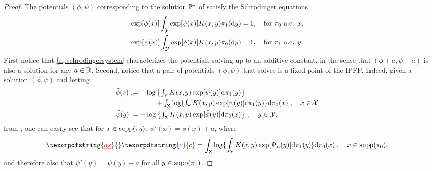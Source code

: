 \documentclass[11pt,a4paper]{article}
\providecommand{\DIFaddtex}[1]{{\protect\color{blue}\uwave{#1}}} %
\providecommand{\DIFdeltex}[1]{{\protect\color{red}\sout{#1}}}                      %
\providecommand{\DIFaddbegin}{} %
\providecommand{\DIFaddend}{} %
\providecommand{\DIFdelbegin}{} %
\providecommand{\DIFdelend}{} %
\providecommand{\DIFadd}[1]{\texorpdfstring{\DIFaddtex{#1}}{#1}} %
\providecommand{\DIFdel}[1]{\texorpdfstring{\DIFdeltex{#1}}{}} %
\begin{document}
\begin{proof}
 The potentials $(\phi, \psi)$ corresponding to the solution $\mathbb{P}^\star$ of  satisfy the Schr\"odinger equations 
 \begin{equation}
     \DIFdelbegin %
\DIFdelend \DIFaddbegin \begin{split}\label{eq:schrodingersystem}
         \exp[\phi(x)] \int_\mcy \exp[\psi(x)] K(x,y) \pi_1(\rmd y) &=1, \quad \text{for $\pi_0$-a.e. $x$}, \\
         \exp[\psi(x)] \int_\mcy  \exp[\phi(x)] K(x,y) \pi_0(\rmd y) &=1, \quad \text{for $\pi_1$-a.e. $y$}.
     \end{split}\DIFaddend 
 \end{equation}
 First notice that \eqref{eq:schrodingersystem} characterizes the potentials solving  up to an additive constant, in the sense that \DIFdelbegin \DIFdel{$(\phi+a, \psi-a)$ }\DIFdelend \DIFaddbegin \DIFadd{$(\phi+c, \psi-c)$ }\DIFaddend is also a solution for any \DIFdelbegin \DIFdel{$a\in \mathbb{R}$}\DIFdelend \DIFaddbegin \DIFadd{$c\in \rset$}\DIFaddend . 
 Second, notice that a pair of potentials $(\phi, \psi)$ that solves  is a fixed point of the IPFP. Indeed, given a solution $(\phi, \psi)$ and letting
 \begin{align}
    &\textstyle{\tilde\phi(x) := -\log \left\{\int_{\mathsf{Y}} K(x,y) \exp[\psi(y)] \mathrm{d}\pi_1(y)\right\} } \\
     &\qquad \qquad \qquad   \textstyle{+ \int_{\mathsf{X}} \log \{ \int_{\mathsf{Y}} K(x,y) \exp[\psi(y)] \mathrm{d}\pi_1(y) \} \mathrm{d}\pi_0(x) \;,  \quad x\in \mathcal{X}} \\
    &\textstyle{\tilde\psi(y) := -\log \left\{\int_{\mathsf{X}} K(x,y) \exp[\tilde\phi(y)] \mathrm{d}\pi_0(x)\right\} \;, \quad y\in \mathcal{Y},} 
  \end{align}
  from , 
 one can easily see that for $x\in \mathrm{supp}(\pi_0)$, \DIFdelbegin \DIFdel{$\phi'(x)=\phi(x)+a$, where 
 }\DIFdelend \DIFaddbegin \DIFadd{$\phi'(x)=\phi(x)+c$, where 
 }\DIFaddend $$\DIFdelbegin \DIFdel{as}\DIFdelend \DIFaddbegin \DIFadd{c}\DIFaddend =\int_{\msx} \log \{ \int_{\msy} K(x,y) \exp[\Psi_n(y)] \rmd \pi_1(y) \} \rmd \pi_0(x) \eqsp ,  \quad x\in \supp(\pi_0),$$
 and therefore also that \DIFdelbegin \DIFdel{$\psi'(y)=\psi(y)-a$ }\DIFdelend \DIFaddbegin \DIFadd{$\psi'(y)=\psi(y)-c$ }\DIFaddend for all $y\in \mathrm{supp}(\pi_1)$. 


\end{proof}
\end{document}
